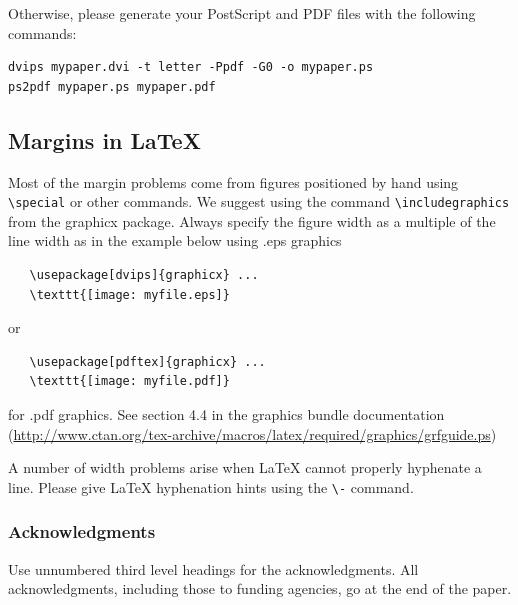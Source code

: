 \documentclass{article} %
\begin{document}
Otherwise, please generate your PostScript and PDF files with the following commands:
\begin{verbatim}
dvips mypaper.dvi -t letter -Ppdf -G0 -o mypaper.ps
ps2pdf mypaper.ps mypaper.pdf
\end{verbatim}

\subsection{Margins in LaTeX}

Most of the margin problems come from figures positioned by hand using
\verb+\special+ or other commands. We suggest using the command
\verb+\includegraphics+
from the graphicx package. Always specify the figure width as a multiple of
the line width as in the example below using .eps graphics
\begin{verbatim}
   \usepackage[dvips]{graphicx} ...
   \texttt{[image: myfile.eps]}
\end{verbatim}
or %
\begin{verbatim}
   \usepackage[pdftex]{graphicx} ...
   \texttt{[image: myfile.pdf]}
\end{verbatim}
for .pdf graphics.
See section 4.4 in the graphics bundle documentation (\url{http://www.ctan.org/tex-archive/macros/latex/required/graphics/grfguide.ps})

A number of width problems arise when LaTeX cannot properly hyphenate a
line. Please give LaTeX hyphenation hints using the \verb+\-+ command.


\subsubsection*{Acknowledgments}

Use unnumbered third level headings for the acknowledgments. All
acknowledgments, including those to funding agencies, go at the end of the paper.



\end{document}
